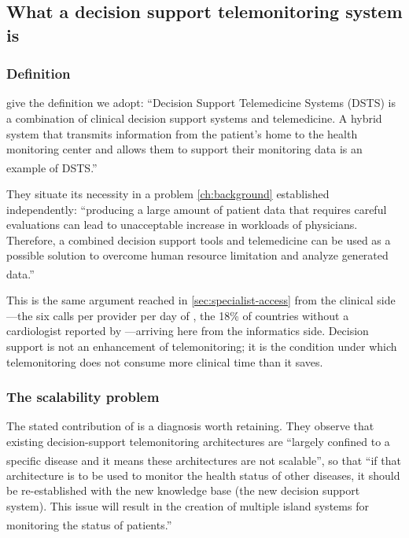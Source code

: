 \documentclass[12pt,a4paper,oneside]{report}
\newcommand{\bq}[1]{``#1''\textsuperscript{\dag}}
\begin{document}
\subsection{What a decision support telemonitoring system is}\label{sec:dsts-def}

\subsubsection{Definition}

\Textcite{yazdani2018} give the definition we adopt: \bq{Decision Support Telemedicine Systems (DSTS) is a combination of clinical decision support systems and telemedicine. A hybrid system that transmits information from the patient's home to the health monitoring center and allows them to support their monitoring data is an example of DSTS.}

They situate its necessity in a problem \cref{ch:background} established independently: \bq{producing a large amount of patient data that requires careful evaluations can lead to unacceptable increase in workloads of physicians. Therefore, a combined decision support tools and telemedicine can be used as a possible solution to overcome human resource limitation and analyze generated data.}

This is the same argument reached in \cref{sec:specialist-access} from the clinical side---the six calls per provider per day of \textcite{kingue2013}, the 18\% of countries without a cardiologist reported by \textcite{segun2025}---arriving here from the informatics side. Decision support is not an enhancement of telemonitoring; it is the condition under which telemonitoring does not consume more clinical time than it saves.

\subsubsection{The scalability problem}

The stated contribution of \textcite{yazdani2018} is a diagnosis worth retaining. They observe that existing decision-support telemonitoring architectures are \bq{largely confined to a specific disease and it means these architectures are not scalable}, so that \bq{if that architecture is to be used to monitor the health status of other diseases, it should be re-established with the new knowledge base (the new decision support system). This issue will result in the creation of multiple island systems for monitoring the status of patients.}
\end{document}

